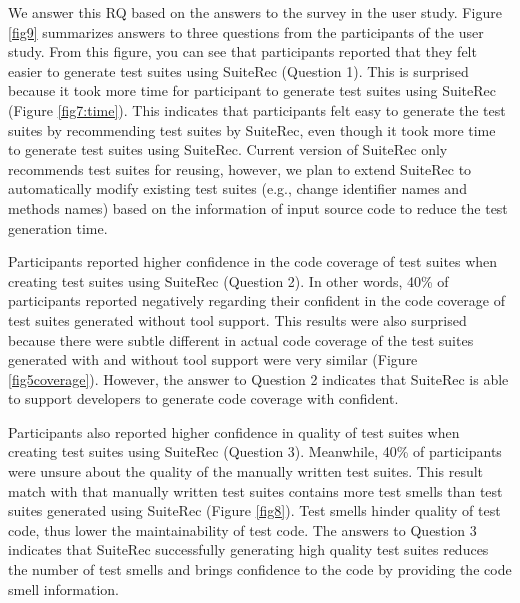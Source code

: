 \documentclass[conference]{IEEEtran}
\begin{document}
We answer this RQ based on the answers to the survey in the user study. Figure \ref{fig9} summarizes answers to three questions from the participants of the user study. From this figure, you can see that participants reported that they felt easier to generate test suites using \textsf{SuiteRec} (Question 1). This is surprised because it took more time for participant to generate test suites using \textsf{SuiteRec} (Figure \ref{fig7:time}). This indicates that participants felt easy to generate the test suites by recommending test suites by \textsf{SuiteRec}, even though it took more time to generate test suites using \textsf{SuiteRec}. Current version of \textsf{SuiteRec} only recommends test suites for reusing, however, we plan to extend \textsf{SuiteRec} to automatically modify existing test suites (e.g., change identifier names and methods names) based on the information of input source code to reduce the test generation time.

 Participants reported higher confidence in the code coverage of test suites when creating test suites using \textsf{SuiteRec} (Question 2). In other words, 40\% of participants reported negatively regarding their confident in the code coverage of test suites generated without tool support. This results were also surprised because there were subtle different in actual code coverage of the test suites generated with and without tool support were very similar (Figure \ref{fig5coverage}). However, the answer to Question 2 indicates that \textsf{SuiteRec} is able to support developers to generate code coverage with confident.

Participants also reported higher confidence in quality of test suites when creating test suites using \textsf{SuiteRec} (Question 3). Meanwhile, 40\% of participants were unsure about the quality of the manually written test suites. This result match with that manually written test suites contains more test smells than test suites generated using \textsf{SuiteRec} (Figure \ref{fig8}). Test smells hinder quality of test code, thus lower the maintainability of test code. The answers to Question 3 indicates that \textsf{SuiteRec} successfully generating high quality test suites reduces the number of test smells and brings confidence to the code by providing the code smell information.
\end{document}

